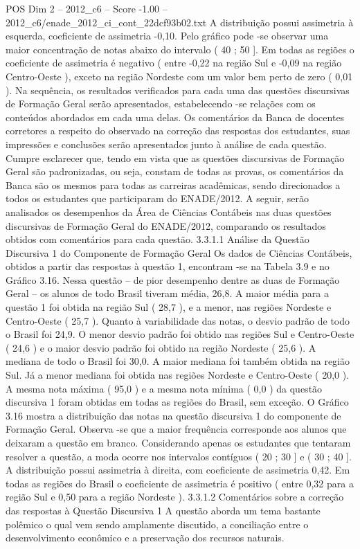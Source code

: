 \begin{textsample}{POS Dim 2 – 2012\_c6 – Score -1.00 – 2012\_c6/enade\_2012\_ci\_cont\_22dcf93b02.txt}
A distribuição possui assimetria à esquerda, coeficiente de assimetria -0,10.
Pelo gráfico pode -se observar uma maior concentração de notas abaixo do intervalo ( 40 ; 50 ].
Em todas as regiões o coeficiente de assimetria é negativo ( entre -0,22 na região Sul e -0,09 na região Centro-Oeste ), exceto na região Nordeste com um valor bem perto de zero ( 0,01 ).
Na sequência, os resultados verificados para cada uma das questões discursivas de Formação Geral serão apresentados, estabelecendo -se relações com os conteúdos abordados em cada uma delas.
Os comentários da Banca de docentes corretores a respeito do observado na correção das respostas dos estudantes, suas impressões e conclusões serão apresentados junto à análise de cada questão.
Cumpre esclarecer que, tendo em vista que as questões discursivas de Formação Geral são padronizadas, ou seja, constam de todas as provas, os comentários da Banca são os mesmos para todas as carreiras acadêmicas, sendo direcionados a todos os estudantes que participaram do ENADE/2012.
A seguir, serão analisados os desempenhos da Área de Ciências Contábeis nas duas questões discursivas de Formação Geral do ENADE/2012, comparando os resultados obtidos com comentários para cada questão. 3.3.1.1 Análise da Questão Discursiva 1 do Componente de Formação Geral Os dados de Ciências Contábeis, obtidos a partir das respostas à questão 1, encontram -se na Tabela 3.9 e no Gráfico 3.16.
Nessa questão – de pior desempenho dentre as duas de Formação Geral – os alunos de todo Brasil tiveram média, 26,8.
A maior média para a questão 1 foi obtida na região Sul ( 28,7 ), e a menor, nas regiões Nordeste e Centro-Oeste ( 25,7 ).
Quanto à variabilidade das notas, o desvio padrão de todo o Brasil foi 24,9.
O menor desvio padrão foi obtido nas regiões Sul e Centro-Oeste ( 24,6 ) e o maior desvio padrão foi obtido na região Nordeste ( 25,6 ).
A mediana de todo o Brasil foi 30,0.
A maior mediana foi também obtida na região Sul.
Já a menor mediana foi obtida nas regiões Nordeste e Centro-Oeste ( 20,0 ).
A mesma nota máxima ( 95,0 ) e a mesma nota mínima ( 0,0 ) da questão discursiva 1 foram obtidas em todas as regiões do Brasil, sem exceção.
O Gráfico 3.16 mostra a distribuição das notas na questão discursiva 1 do componente de Formação Geral.
Observa -se que a maior frequência corresponde aos alunos que deixaram a questão em branco.
Considerando apenas os estudantes que tentaram resolver a questão, a moda ocorre nos intervalos contíguos ( 20 ; 30 ] e ( 30 ; 40 ].
A distribuição possui assimetria à direita, com coeficiente de assimetria 0,42.
Em todas as regiões do Brasil o coeficiente de assimetria é positivo ( entre 0,32 para a região Sul e 0,50 para a região Nordeste ). 3.3.1.2 Comentários sobre a correção das respostas à Questão Discursiva 1 A questão aborda um tema bastante polêmico o qual vem sendo amplamente discutido, a conciliação entre o desenvolvimento econômico e a preservação dos recursos naturais.

\end{textsample}
